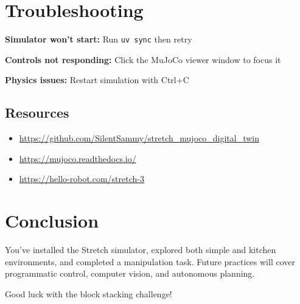 \documentclass[11pt,a4paper]{article}
\begin{document}
\section{Troubleshooting}

\textbf{Simulator won't start:} Run \texttt{uv sync} then retry

\textbf{Controls not responding:} Click the MuJoCo viewer window to focus it

\textbf{Physics issues:} Restart simulation with Ctrl+C

\subsection{Resources}

\begin{itemize}
    \item \url{https://github.com/SilentSammy/stretch_mujoco_digital_twin}
    \item \url{https://mujoco.readthedocs.io/}
    \item \url{https://hello-robot.com/stretch-3}
\end{itemize}

\section{Conclusion}

You've installed the Stretch simulator, explored both simple and kitchen environments, and completed a manipulation task. Future practices will cover programmatic control, computer vision, and autonomous planning.

Good luck with the block stacking challenge!
\end{document}
